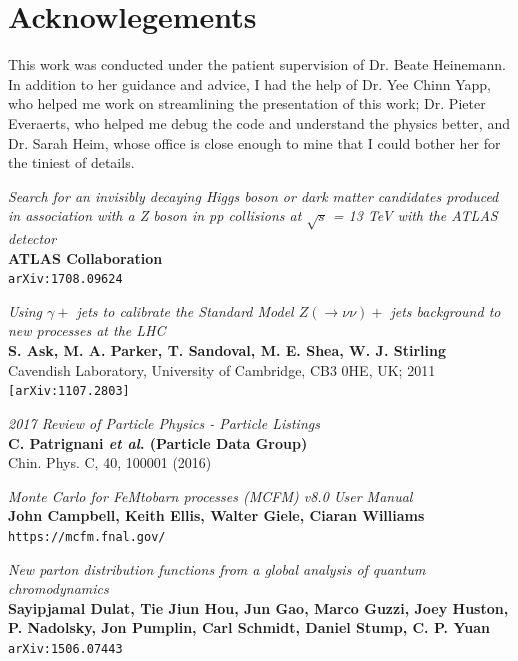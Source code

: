 \documentclass[11pt,a4paper,final]{report}
\begin{document}
\section*{Acknowlegements}
This work was conducted under the patient supervision of Dr. Beate Heinemann. In addition to her guidance and advice, I had the help of Dr. Yee Chinn Yapp, who helped me work on streamlining the presentation of this work; Dr. Pieter Everaerts, who helped me debug the code and understand the physics better, and Dr. Sarah Heim, whose office is close enough to mine that I could bother her for the tiniest of details.

\begin{thebibliography}{9}

	\textit{Search for an invisibly decaying Higgs boson or dark matter candidates produced in association with a Z boson in pp collisions at $\sqrt{s}$ = 13 TeV with the ATLAS detector}\\
	\textbf{ATLAS Collaboration}\\
	\texttt{arXiv:1708.09624}
	
	\textit{Using $\gamma +$ jets to calibrate the Standard Model $Z(\rightarrow \nu\nu)+$ jets background to new processes at the LHC}\\
	\textbf{S. Ask, M. A. Parker, T. Sandoval, M. E. Shea, W. J. Stirling}\\
Cavendish Laboratory, University of Cambridge, CB3 0HE, UK; 2011\\
	\texttt{[arXiv:1107.2803]}

	\textit{2017 Review of Particle Physics - Particle Listings}\\
	\textbf{C. Patrignani \textit{et al}. (Particle Data Group)}\\
	Chin. Phys. C, 40, 100001 (2016)
	
	\textit{Monte Carlo for FeMtobarn processes (MCFM) v8.0 User Manual}\\
	\textbf{John Campbell, Keith Ellis, Walter Giele, Ciaran Williams}\\
	\texttt{https://mcfm.fnal.gov/}
	
	\textit{New parton distribution functions from a global analysis of quantum chromodynamics}\\
	\textbf{Sayipjamal Dulat, Tie Jiun Hou, Jun Gao, Marco Guzzi, Joey Huston, P. Nadolsky, Jon Pumplin, Carl Schmidt, Daniel Stump, C. P. Yuan}\\
	\texttt{arXiv:1506.07443}


\end{thebibliography}
\end{document}

